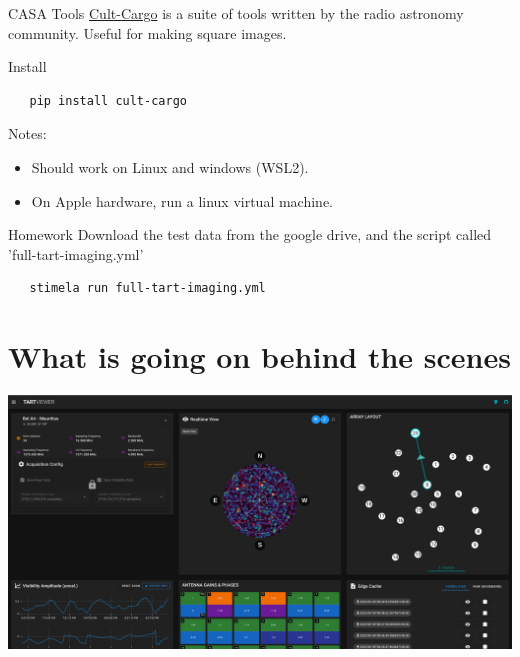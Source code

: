 \documentclass[ignorenonframetext]{beamer}
\begin{document}
\begin{frame}[fragile]{CASA Tools}
  \href{https://github.com/caracal-pipeline/cult-cargo}{Cult-Cargo} is a suite of tools written by the radio astronomy community. Useful for making square images.

  \begin{block}{Install}
  \begin{verbatim}
   pip install cult-cargo
  \end{verbatim}
  \end{block}

  Notes:
  \begin{itemize}
   \item Should work on Linux and windows (WSL2).
   \item On Apple hardware, run a linux virtual machine.
  \end{itemize}
   \begin{block}{Homework}
   Download the test data from the google drive, and the script called 'full-tart-imaging.yml'
  \begin{verbatim}
   stimela run full-tart-imaging.yml
  \end{verbatim}

   \end{block}

\end{frame}

\section{What is going on behind the scenes}

\frame{\tableofcontents[currentsection]}


\begin{frame}
 \includegraphics[width=\linewidth]{../tart_overview/fig/browser_view.png}
\end{frame}
\end{document}
